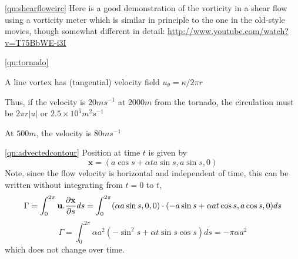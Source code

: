 \documentclass[10pt]{report}
\begin{document}
\begin{answer4}
\begin{questionnumber}{\ref{qn:shearflowcirc}}
Here is a good demonstration of the vorticity in a shear flow using a
vorticity meter which is similar in principle to the one in the old-style
movies, though somewhat different in detail:
\url{http://www.youtube.com/watch?v=T75BbWE-i3I}

\end{questionnumber}

\begin{questionnumber}{\ref{qn:tornado}}

	A line vortex has (tangential) velocity field ${u_{\theta}} = \kappa / 2\pi r$

	Thus, if the velocity is $20ms^{-1}$ at $2000m$ from the tornado,
	the circulation must be $2\pi r |u|$ or $2.5\times 10^{5} m^{2}s^{-1}$

	At $500m$, the velocity is $80ms^{-1}$

\end{questionnumber}

\begin{questionnumber}{\ref{qn:advectedcontour}}
Position at time $t$ is given by
\[
	{\bm x} = ( a\cos s + \alpha t a \sin s, a \sin s, 0 )
\]
Note, since the flow velocity is horizontal and independent of time,
this can be written without integrating from $t=0$ to $t$,
\[
	\Gamma = \int_0^{2\pi} {\bf u}.\frac{\partial {\bf x}}{\partial s} ds =
	\int_{0}^{2\pi} (\alpha a \sin s, 0, 0 ) \cdot
	          ( - a \sin s + \alpha a t \cos s, a \cos s, 0 ) ds
\]
\[
     \Gamma = \int_0^{2\pi} \alpha a^{2} \left( -\sin^{2}s +
     		\alpha t \sin s \cos s \right) ds = -\pi \alpha a^{2}
\]
which does not change over time.
\end{questionnumber}


\end{answer4}
\end{document}

